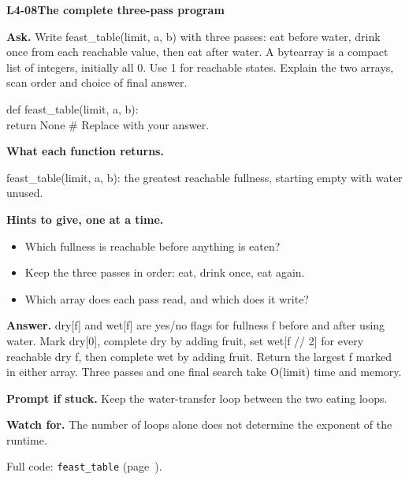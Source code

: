 \documentclass[11pt,a4paper]{article}
\begin{document}
\noindent\begin{minipage}{\textwidth}
{\color{teal}\textbf{L4-08}}\quad \textbf{The complete three-pass program}\par\smallskip
\textbf{Ask.} Write feast\_table(limit, a, b) with three passes: eat before water, drink once from each reachable value, then eat after water. A bytearray is a compact list of integers, initially all 0. Use 1 for reachable states. Explain the two arrays, scan order and choice of final answer.\par\smallskip
\par{}\par\smallskip\noindent\colorbox{codepaper}{\parbox{\dimexpr\linewidth-2\fboxsep\relax}{\small\ttfamily\raggedright def feast\_table(limit, a, b):\\\hspace*{2.4em}return None  \# Replace with your answer.}}\par
{\small\textbf{What each function returns.}\par feast\_table(limit, a, b): the greatest reachable fullness, starting empty with water unused.\par }
{\small\textbf{Hints to give, one at a time.}}\begin{itemize}\item Which fullness is reachable before anything is eaten?\item Keep the three passes in order: eat, drink once, eat again.\item Which array does each pass read, and which does it write?\end{itemize}
\textbf{Answer.} dry[f] and wet[f] are yes/no flags for fullness f before and after using water. Mark dry[0], complete dry by adding fruit, set wet[f // 2] for every reachable dry f, then complete wet by adding fruit. Return the largest f marked in either array. Three passes and one final search take O(limit) time and memory.\par\smallskip
\textbf{Prompt if stuck.} Keep the water-transfer loop between the two eating loops.\par\smallskip
\textbf{Watch for.} The number of loops alone does not determine the exponent of the runtime.\par\smallskip Full code: \texttt{feast\_table} (page~\pageref{L4-code-feast_table}).
\end{minipage}\par{}\medskip
\end{document}
